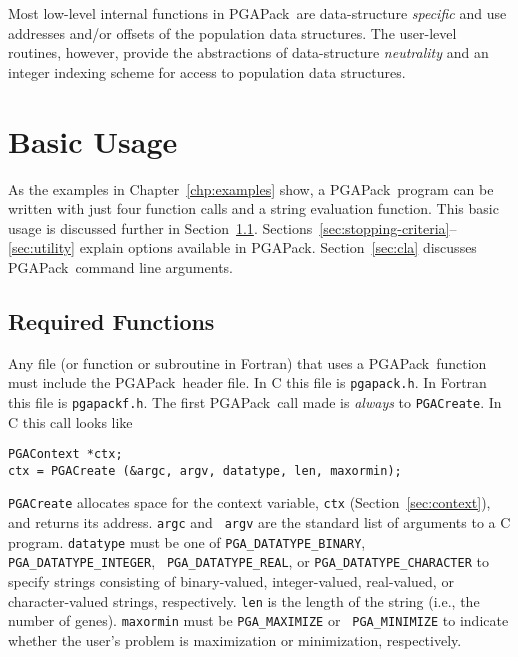 \documentclass{report}
\newcommand{\pga}{PGAPack}
\begin{document}
Most  low-level internal functions in \pga\ are
data-structure {\em specific} and use addresses and/or offsets of the
population data structures.  The user-level routines, however, provide the
abstractions of data-structure {\em neutrality} and an integer indexing scheme
for access to population data structures.



\chapter{Basic Usage}\label{chp:functionality}

As the examples in Chapter~\ref{chp:examples} show, a \pga\ program can be
written with just four function calls and a string evaluation function.  This
basic usage is discussed further in Section~\ref{sec:big-picture}.
Sections~\ref{sec:stopping-criteria}--\ref{sec:utility} explain options
available in \pga.  Section~\ref{sec:cla} discusses \pga\ command line
arguments.

\section{Required Functions}\label{sec:big-picture}

Any file (or function or subroutine in Fortran) that uses a \pga\ function must
include the \pga\ header file.  In C this file is {\tt pgapack.h}.  In Fortran
this file is {\tt pgapackf.h}.  The first \pga\ call made is {\em always} to
{\tt PGACreate}.  In C this call looks like
\begin{verbatim}
PGAContext *ctx;
ctx = PGACreate (&argc, argv, datatype, len, maxormin);
\end{verbatim}
{\tt PGACreate} allocates space for the context variable, {\tt ctx}
(Section~\ref{sec:context}), and returns its address. {\tt argc} and {\tt
argv} are the standard list of arguments to a C program.  {\tt datatype} must
be one of {\tt PGA\_DATATYPE\_BINARY}, {\tt PGA\_DATATYPE\_INTEGER}, {\tt
PGA\_DATATYPE\_REAL}, or {\tt PGA\_DATATYPE\_CHARACTER} to specify strings
consisting of binary-valued, integer-valued, real-valued, or character-valued
strings, respectively.  {\tt len} is the length of the string (i.e., the
number of genes).  {\tt maxormin} must be {\tt PGA\_MAXIMIZE} or {\tt
PGA\_MINIMIZE} to indicate whether the user's problem is maximization or
minimization, respectively.
\end{document}
